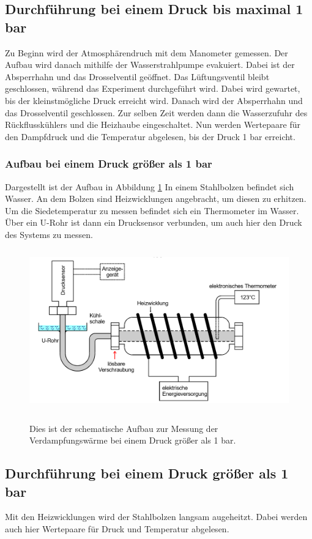     \subsection{Durchführung bei einem Druck bis maximal 1 bar}
    Zu Beginn wird der Atmosphärendruch mit dem Manometer gemessen.
    Der Aufbau wird danach mithilfe der Wasserstrahlpumpe evakuiert.
    Dabei ist der Absperrhahn und das Drosselventil geöffnet. 
    Das Lüftungsventil bleibt geschlossen, während das Experiment durchgeführt wird. 
    Dabei wird gewartet, bis der kleinstmögliche Druck erreicht wird.
    Danach wird der Absperrhahn und das Drosselventil geschlossen.
    Zur selben Zeit werden dann die Wasserzufuhr des Rückflusskühlers und die Heizhaube eingeschaltet.
    Nun werden Wertepaare für den Dampfdruck und die Temperatur abgelesen, bis der Druck 1 bar erreicht.

    \subsubsection{Aufbau bei einem Druck größer als 1 bar}
    Dargestellt ist der Aufbau in Abbildung \ref{fig:aufbau2}
    In einem Stahlbolzen befindet sich Wasser.
    An dem Bolzen sind Heizwicklungen angebracht, um diesen zu erhitzen.
    Um die Siedetemperatur zu messen befindet sich ein Thermometer im Wasser.
    Über ein U-Rohr ist dann ein Drucksensor verbunden, um auch hier den Druck des Systems zu messen.%

    \begin{figure}[H]
        \centering
        \includegraphics[height=7cm]{Bilder/Aufbau2.png}
        \label{fig:aufbau2}
        \caption{Dies ist der schematische Aufbau zur Messung der Verdampfungswärme bei einem Druck größer als 1 bar.}
    \end{figure}

    \subsection{Durchführung bei einem Druck größer als 1 bar}
    Mit den Heizwicklungen wird der Stahlbolzen langsam augeheitzt.
    Dabei werden auch hier Wertepaare für Druck und Temperatur abgelesen.
